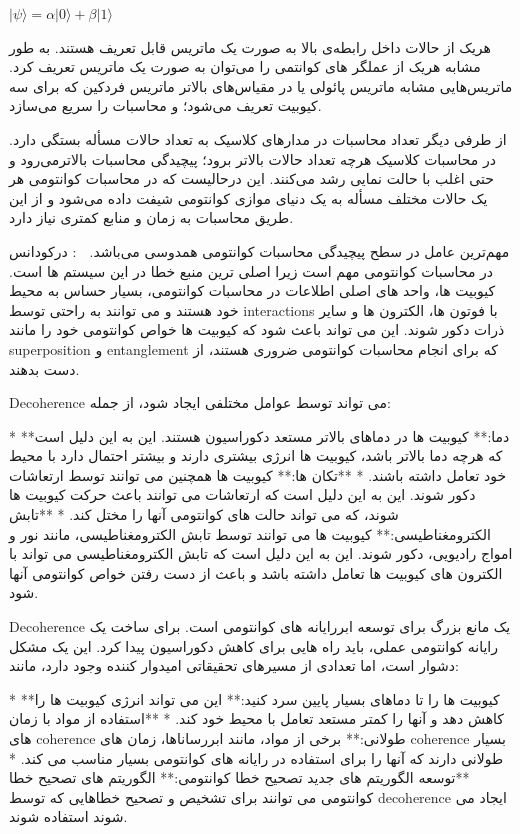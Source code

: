 \documentclass{book}
\begin{document}
\begin{center}
	$\vert\psi\rangle = \alpha\vert0\rangle + \beta\vert1\rangle$
\end{center}

هریک از حالات داخل رابطه‌ی بالا به صورت یک ماتریس قابل تعریف هستند. به طور مشابه هریک از عملگر های کوانتمی را می‌توان به صورت یک ماتریس تعریف کرد. ماتریس‌هایی مشابه ماتریس پائولی یا در مقیاس‌های بالاتر ماتریس فردکین که برای سه کیوبیت تعریف می‌شود؛ و محاسبات را سریع می‌سازد.



از طرفی دیگر تعداد محاسبات در مدار‌های کلاسیک به تعداد حالات مسأله بستگی دارد. در محاسبات کلاسیک هرچه تعداد حالات بالاتر برود؛ پیچیدگی محاسبات بالاتر‌می‌رود و حتی اغلب با حالت نمایی رشد می‌کنند. این درحالیست که در محاسبات کوانتومی هر یک حالات مختلف مسأله به یک دنیای موازی کوانتومی شیفت داده می‌شود و از این طریق محاسبات به زمان و منابع کمتری نیاز دارد.


مهم‌ترین عامل در سطح پیچیدگی محاسبات کوانتومی همدوسی می‌باشد. 
🤖 : درکودانس در محاسبات کوانتومی مهم است زیرا اصلی ترین منبع خطا در این سیستم ها است. کیوبیت ها، واحد های اصلی اطلاعات در محاسبات کوانتومی، بسیار حساس به محیط خود هستند و می توانند به راحتی توسط  interactions با فوتون ها، الکترون ها و سایر ذرات دکور شوند. این می تواند باعث شود که کیوبیت ها خواص کوانتومی خود را مانند superposition و entanglement که برای انجام محاسبات کوانتومی ضروری هستند، از دست بدهند.

Decoherence می تواند توسط عوامل مختلفی ایجاد شود، از جمله:

* **دما:** کیوبیت ها در دماهای بالاتر مستعد دکوراسیون هستند. این به این دلیل است که هرچه دما بالاتر باشد، کیوبیت ها انرژی بیشتری دارند و بیشتر احتمال دارد با محیط خود تعامل داشته باشند.
* **تکان ها:** کیوبیت ها همچنین می توانند توسط ارتعاشات دکور شوند. این به این دلیل است که ارتعاشات می توانند باعث حرکت کیوبیت ها شوند، که می تواند حالت های کوانتومی آنها را مختل کند.
* **تابش الکترومغناطیسی:** کیوبیت ها می توانند توسط تابش الکترومغناطیسی، مانند نور و امواج رادیویی، دکور شوند. این به این دلیل است که تابش الکترومغناطیسی می تواند با الکترون های کیوبیت ها تعامل داشته باشد و باعث از دست رفتن خواص کوانتومی آنها شود.

Decoherence یک مانع بزرگ برای توسعه ابررایانه های کوانتومی است. برای ساخت یک رایانه کوانتومی عملی، باید راه هایی برای کاهش دکوراسیون پیدا کرد. این یک مشکل دشوار است، اما تعدادی از مسیرهای تحقیقاتی امیدوار کننده وجود دارد، مانند:

* **کیوبیت ها را تا دماهای بسیار پایین سرد کنید:** این می تواند انرژی کیوبیت ها را کاهش دهد و آنها را کمتر مستعد تعامل با محیط خود کند.
* **استفاده از مواد با زمان های coherence طولانی:** برخی از مواد، مانند ابررساناها، زمان های coherence بسیار طولانی دارند که آنها را برای استفاده در رایانه های کوانتومی بسیار مناسب می کند.
* **توسعه الگوریتم های جدید تصحیح خطا کوانتومی:** الگوریتم های تصحیح خطا کوانتومی می توانند برای تشخیص و تصحیح خطاهایی که توسط decoherence ایجاد می شوند استفاده شوند.
\end{document}
